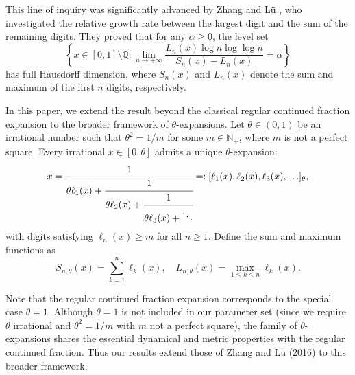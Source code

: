 \documentclass{article}
\numberwithin{equation}{section}
\begin{document}
This line of inquiry was significantly advanced by Zhang and L\"u \cite{ZhangLu}, who investigated the relative growth rate between the largest digit and the sum of the remaining digits. They proved that for any $\alpha \geq 0$, the level set
\[
\left\{ x \in [0,1] \setminus \mathbb{Q} : \lim_{n \to +\infty} \frac{L_n(x) \log n \log \log n}{S_n(x) - L_n(x)} = \alpha \right\}
\]
has full Hausdorff dimension, where $S_n(x)$ and $L_n(x)$ denote the sum and maximum of the first $n$ digits, respectively. 

In this paper, we extend the result beyond the classical regular continued fraction expansion to the broader framework of $\theta$-expansions. Let $\theta \in (0,1)$ be an irrational number such that $\theta^2 = 1/m$ for some $m \in \mathbb{N}_+$, where $m$ is not a perfect square. Every irrational $x \in [0, \theta]$ admits a unique $\theta$-expansion:
\begin{equation} \label{1.1}
{x = \cfrac{1}{\theta\ell_1(x) + \cfrac{1}{\theta\ell_2(x) + \cfrac{1}{\theta\ell_3(x) + \ddots}}}} =: [\ell_1(x), \ell_2(x), \ell_3(x), \ldots]_\theta,
\end{equation}
with digits satisfying $\ell_n(x) \geq m$ for all $n \geq 1$. Define the sum and maximum functions as
\[
S_{n,\theta}(x) = \sum_{k=1}^n \ell_k(x), \quad L_{n,\theta}(x) = \max_{1 \leq k \leq n} \ell_k(x).
\]


{Note that the regular continued fraction expansion corresponds to the special case $\theta = 1$. 
Although $\theta = 1$ is not included in our parameter set (since we require $\theta$ irrational and $\theta^2 = 1/m$ with $m$ not a perfect square), 
the family of $\theta$-expansions shares the essential dynamical and metric properties with the regular continued fraction. 
Thus our results extend those of Zhang and L\"u (2016) to this broader framework.}
\end{document}
